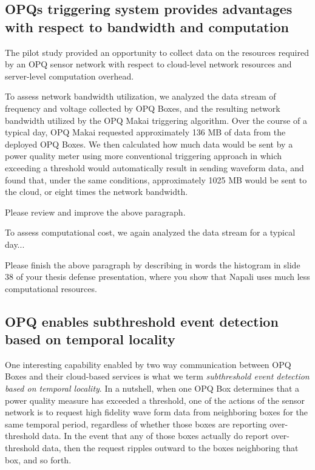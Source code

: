 \subsection{OPQs triggering system provides advantages with respect to bandwidth and computation}

The pilot study provided an opportunity to collect data on the resources required by an OPQ sensor network with respect to cloud-level network resources and server-level computation overhead.

To assess network bandwidth utilization, we analyzed the data stream of frequency and voltage collected by OPQ Boxes, and the resulting network bandwidth utilized by the OPQ Makai triggering algorithm. Over the course of a typical day, OPQ Makai requested approximately 136 MB of data from the deployed OPQ Boxes.  We then calculated how much data would be sent by a power quality meter using more conventional triggering approach in which exceeding a threshold would automatically result in sending waveform data, and found that, under the same conditions, approximately 1025 MB would be sent to the cloud, or eight times the network bandwidth.

\begin{tcolorbox}[colback=blue!5!white,colframe=blue!75!black,title=SERGE]
Please review and improve the above paragraph.
\end{tcolorbox}

To assess computational cost, we again analyzed the data stream for a typical day...

\begin{tcolorbox}[colback=blue!5!white,colframe=blue!75!black,title=SERGE]
Please finish the above paragraph by describing in words the histogram in slide 38 of your thesis defense presentation, where you show that Napali uses much less computational resources.
\end{tcolorbox}

\subsection{OPQ enables subthreshold event detection based on temporal locality}
\label{sec:subthreshold-events}

One interesting capability enabled by two way communication between OPQ Boxes and their cloud-based services is what we term {\em subthreshold event detection based on temporal locality}.  In a nutshell, when one OPQ Box determines that a power quality measure has exceeded a threshold, one of the actions of the sensor network is to request high fidelity wave form data from neighboring boxes for the same temporal period, regardless of whether those boxes are reporting over-threshold data. In the event that any of those boxes actually do report over-threshold data, then the request ripples outward to the boxes neighboring that box, and so forth.

